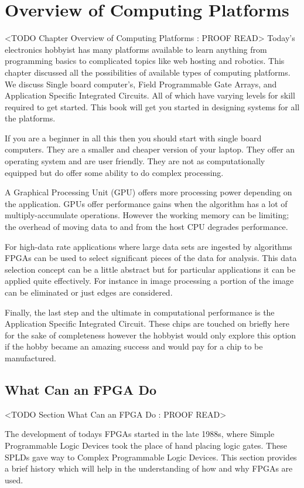 \chapter{Overview of Computing Platforms}
	<TODO Chapter Overview of Computing Platforms : PROOF READ>
Today's electronics hobbyist has many platforms available to learn anything from programming basics to complicated topics like web hosting and robotics. This chapter discussed all the possibilities of available types of computing platforms. We discuss Single board computer's, Field Programmable Gate Arrays, and Application Specific Integrated Circuits. All of which have varying levels for skill required to get started. This book will get you started in designing systems for all the platforms.  

If you are a beginner in all this then you should start with single board computers. They are a smaller and cheaper version of your laptop. They offer an operating system and are user friendly. They are not as computationally equipped but do offer some ability to do complex processing. 

A Graphical Processing Unit (GPU) offers more processing power depending on the application. GPUs offer performance gains when the algorithm has a lot of multiply-accumulate operations. However the working memory can be limiting; the overhead of moving data to and from the host CPU degrades performance.

For high-data rate applications where large data sets are ingested by algorithms FPGAs can be used to select significant pieces of the data for analysis. This data selection concept can be a little abstract but for particular applications it can be applied quite effectively. For instance in image processing a portion of the image can be eliminated or just edges are considered. 

Finally, the last step and the ultimate in computational performance is the Application Specific Integrated Circuit. These chips are touched on briefly here for the sake of completeness however the hobbyist would only explore this option if the hobby became an amazing success and would pay for a chip to be manufactured. 
	
	
\section{What Can an FPGA Do}
	<TODO Section What Can an FPGA Do : PROOF READ>

The development of todays FPGAs started in the late 1988s, where Simple Programmable Logic Devices took the place of hand placing logic gates. These SPLDs gave way to Complex Programmable Logic Devices. This section provides a brief history which will help in the understanding of how and why FPGAs are used.  	

